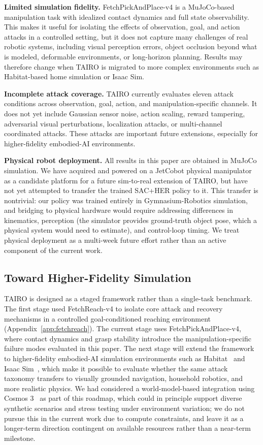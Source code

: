 \documentclass[conference]{IEEEtran}
\begin{document}
\textbf{Limited simulation fidelity.}
FetchPickAndPlace-v4 is a MuJoCo-based manipulation task with idealized contact
dynamics and full state observability. This makes it useful for isolating the effects
of observation, goal, and action attacks in a controlled setting, but it does not
capture many challenges of real robotic systems, including visual perception errors,
object occlusion beyond what is modeled, deformable environments, or long-horizon
planning. Results may therefore change when TAIRO is migrated to more complex
environments such as Habitat-based home simulation or Isaac Sim.

\textbf{Incomplete attack coverage.}
TAIRO currently evaluates eleven attack conditions across observation, goal, action, and
manipulation-specific channels. It does not yet include Gaussian sensor noise, action
scaling, reward tampering, adversarial visual perturbations, localization attacks, or
multi-channel coordinated attacks. These attacks are important future extensions,
especially for higher-fidelity embodied-AI environments.

\textbf{Physical robot deployment.}
All results in this paper are obtained in MuJoCo simulation. We have acquired and
powered on a JetCobot physical manipulator as a candidate platform for a future
sim-to-real extension of TAIRO, but have not yet attempted to transfer the trained
SAC+HER policy to it. This transfer is nontrivial: our policy was trained entirely in
Gymnasium-Robotics simulation, and bridging to physical hardware would require
addressing differences in kinematics, perception (the simulator provides ground-truth
object pose, which a physical system would need to estimate), and control-loop timing.
We treat physical deployment as a multi-week future effort rather than an active
component of the current work.

\subsection{Toward Higher-Fidelity Simulation}

TAIRO is designed as a staged framework rather than a single-task benchmark. The first
stage used FetchReach-v4 to isolate core attack and recovery mechanisms in a controlled
goal-conditioned reaching environment (Appendix~\ref{app:fetchreach}). The current stage
uses FetchPickAndPlace-v4, where contact dynamics and grasp stability introduce the
manipulation-specific failure modes evaluated in this paper. The next stage will extend
the framework to higher-fidelity embodied-AI simulation environments such as
Habitat~\cite{puig2023habitat3} and Isaac Sim~\cite{nvidia2026isaacsim}, which make it
possible to evaluate whether the same attack taxonomy transfers to visually grounded
navigation, household robotics, and more realistic physics. We had considered a
world-model-based integration using Cosmos 3~\cite{agarwal2026cosmos3} as part of this
roadmap, which could in principle support diverse synthetic scenarios and stress
testing under environment variation; we do not pursue this in the current work due to
compute constraints, and leave it as a longer-term direction contingent on available
resources rather than a near-term milestone.
\end{document}
